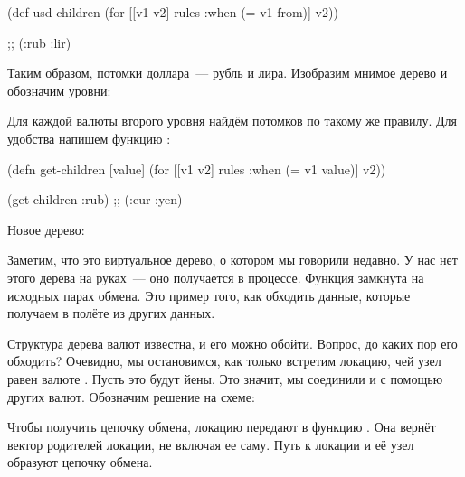 \begin{english}
  \begin{clojure}
(def usd-children
  (for [[v1 v2] rules
        :when (= v1 from)]
    v2))

;; (:rub :lir)
  \end{clojure}
\end{english}

Таким образом, потомки доллара~--- рубль и лира. Изобразим мнимое дерево и
обозначим уровни:

\begin{figure}[H]
  \centering
  
  \label{fig:chart-zip-14}
\end{figure}

Для каждой валюты второго уровня найдём потомков по такому же правилу. Для
удобства напишем функцию :

\begin{english}
  \begin{clojure}
(defn get-children [value]
  (for [[v1 v2] rules
        :when (= v1 value)]
    v2))

(get-children :rub)
;; (:eur :yen)
  \end{clojure}
\end{english}

Новое дерево:

\begin{figure}[H]
  \centering
  
  \label{fig:chart-zip-15}
\end{figure}

Заметим, что это виртуальное дерево, о котором мы говорили недавно. У нас нет
этого дерева на руках~--- оно получается в процессе. Функция 
замкнута на исходных парах обмена. Это пример того, как обходить данные, которые
получаем в полёте из других данных.

Структура дерева валют известна, и его можно обойти. Вопрос, до каких пор его
обходить? Очевидно, мы остановимся, как только встретим локацию, чей узел равен
валюте . Пусть это будут йены. Это значит, мы соединили  и  с
помощью других валют. Обозначим решение на схеме:

\begin{figure}[H]
  \centering
  
  \label{fig:chart-zip-16}
\end{figure}

Чтобы получить цепочку обмена, локацию  передают в функцию . Она
вернёт вектор родителей локации, не включая ее саму. Путь к локации и её узел
образуют цепочку обмена.

